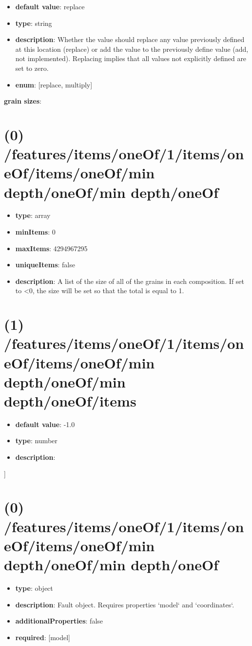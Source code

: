\begin{itemize}[leftmargin=0em]\item {\bf default value}: replace
\item {\bf type}: string
\item {\bf description}: Whether the value should replace any value previously defined at this location (replace) or add the value to the previously define value (add, not implemented). Replacing implies that all values not explicitly defined are set to zero.
\item {\bf enum}: [replace, multiply]\end{itemize}\item {\bf grain sizes}: \section{(0) /features/items/oneOf/1/items/oneOf/items/oneOf/min depth/oneOf/min depth/oneOf}
\begin{itemize}[leftmargin=0em]\item {\bf type}: array
\item {\bf minItems}: 0
\item {\bf maxItems}: 4294967295
\item {\bf uniqueItems}: false
\item {\bf description}: A list of the size of all of the grains in each composition. If set to <0, the size will be set so that the total is equal to 1.
\end{itemize}\section{(1) /features/items/oneOf/1/items/oneOf/items/oneOf/min depth/oneOf/min depth/oneOf/items}
\begin{itemize}[leftmargin=1em]\item {\bf default value}: -1.0
\item {\bf type}: number
\item {\bf description}: 
\end{itemize}]\section{(0) /features/items/oneOf/1/items/oneOf/items/oneOf/min depth/oneOf/min depth/oneOf}
\begin{itemize}[leftmargin=0em]\item {\bf type}: object
\item {\bf description}: Fault object. Requires properties `model` and `coordinates`.
\item {\bf additionalProperties}: false
\item {\bf required}: [model]\end{itemize}
